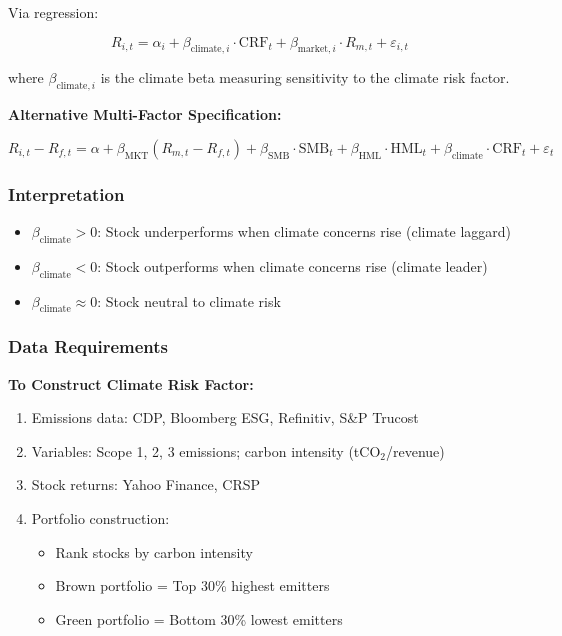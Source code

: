 \documentclass[11pt,a4paper]{article}
\begin{document}
Via regression:

\begin{equation}
R_{i,t} = \alpha_i + \beta_{\text{climate},i} \cdot \text{CRF}_t + \beta_{\text{market},i} \cdot R_{m,t} + \varepsilon_{i,t}
\end{equation}

where $\beta_{\text{climate},i}$ is the climate beta measuring sensitivity to the climate risk factor.

\textbf{Alternative Multi-Factor Specification:}

\begin{equation}
R_{i,t} - R_{f,t} = \alpha + \beta_{\text{MKT}}(R_{m,t} - R_{f,t}) + \beta_{\text{SMB}} \cdot \text{SMB}_t + \beta_{\text{HML}} \cdot \text{HML}_t + \beta_{\text{climate}} \cdot \text{CRF}_t + \varepsilon_t
\end{equation}

\subsubsection{Interpretation}

\begin{itemize}
    \item $\beta_{\text{climate}} > 0$: Stock underperforms when climate concerns rise (climate laggard)
    \item $\beta_{\text{climate}} < 0$: Stock outperforms when climate concerns rise (climate leader)
    \item $\beta_{\text{climate}} \approx 0$: Stock neutral to climate risk
\end{itemize}

\subsubsection{Data Requirements}

\textbf{To Construct Climate Risk Factor:}
\begin{enumerate}
    \item Emissions data: CDP, Bloomberg ESG, Refinitiv, S\&P Trucost
    \item Variables: Scope 1, 2, 3 emissions; carbon intensity (tCO$_2$/revenue)
    \item Stock returns: Yahoo Finance, CRSP
    \item Portfolio construction:
    \begin{itemize}
        \item Rank stocks by carbon intensity
        \item Brown portfolio = Top 30\% highest emitters
        \item Green portfolio = Bottom 30\% lowest emitters
    \end{itemize}
\end{enumerate}
\end{document}
